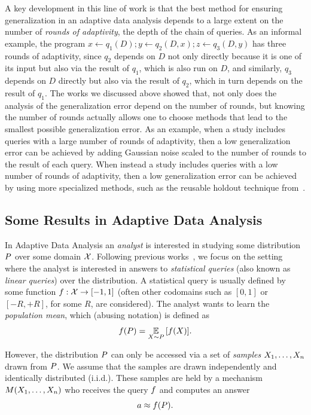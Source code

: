 A key development in this line of work is that the best method for ensuring generalization in an adaptive data analysis depends to a large extent on the number of \emph{rounds of adaptivity}, the depth of the chain of queries. As an informal example, the program $x \leftarrow q_1(D);y \leftarrow q_2(D,x);z \leftarrow q_3(D,y)$ has three rounds of adaptivity, since $q_2$  depends on $D$ not only directly because it is one of its input but also via the result of $q_1$, which is also run on $D$, and similarly,  $q_3$ depends on $D$ directly but also via the result of $q_2$, which in turn depends on the result of $q_1$. The works we discussed above showed that, not only does the analysis of the generalization error depend on the number of rounds, but knowing the number of rounds actually allows one to choose methods that lead to the smallest possible generalization error. As an example, when a study includes queries with a large number of rounds of adaptivity, then a low generalization error can be achieved by adding Gaussian noise scaled to the number of rounds to the result of each query.
When instead a study includes queries with a low number of rounds of adaptivity, then a low generalization error can be achieved by using more specialized methods, such as the reusable holdout technique from~\citet{DworkFHPRR15}. 


\subsection{Some Results in Adaptive Data Analysis}
In Adaptive Data Analysis an \emph{analyst} is interested in studying some distribution $P$ over some domain $\mathcal{X}$.  Following previous works~\cite{DworkFHPRR15,HardtU14,BassilyNSSSU16}, we focus on the setting where the analyst is interested in answers to \emph{statistical queries} (also known as \emph{linear queries}) over the distribution.  A statistical query is usually defined by some function $f : \mathcal{X} \to [-1,1]$ (often other codomains such as $[0,1]$ or $[-R,+R]$, for some $R$, are considered).  The analyst wants to learn the \emph{population mean}, which (abusing notation) is defined as $$\query(\dist) = \ex{\sample \sim \dist}{\query(\sample)}.$$

However, the distribution $P$ can only be accessed via a set of \emph{samples} $X_1,\dots,X_n$ drawn from $P$. We assume that the samples are drawn independently and identically distributed (i.i.d.).  These samples are held by a mechanism $M(X_1,\dots,X_n)$ who receives the query $f$ and computes an answer 
$$a \approx f(P).$$

